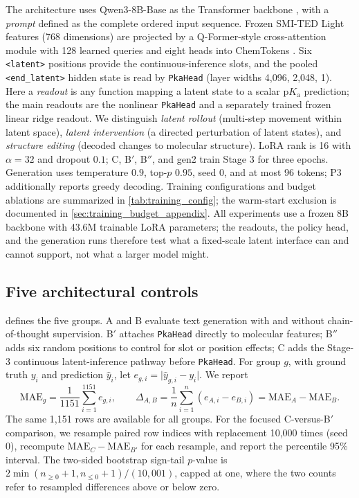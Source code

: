\documentclass[11pt]{article}
\newcommand{\pka}{\mathrm{p}K_{\mathrm a}}
\newcommand{\MAE}{\mathrm{MAE}}
\begin{document}
The architecture uses Qwen3-8B-Base as the Transformer backbone \citep{Vaswani2017Attention,Yang2025Qwen3}, with a \emph{prompt} defined as the complete ordered input sequence. Frozen SMI-TED Light features (768 dimensions) are projected by a Q-Former-style cross-attention module with 128 learned queries and eight heads into ChemTokens \citep{Soares2025SMITED,Li2023BLIP2}. Six \texttt{<latent>} positions provide the continuous-inference slots, and the pooled \texttt{<end\_latent>} hidden state is read by \texttt{PkaHead} (layer widths 4{,}096, 2{,}048, 1). Here a \emph{readout} is any function mapping a latent state to a scalar $\pka$ prediction; the main readouts are the nonlinear \texttt{PkaHead} and a separately trained frozen linear ridge readout. We distinguish \emph{latent rollout} (multi-step movement within latent space), \emph{latent intervention} (a directed perturbation of latent states), and \emph{structure editing} (decoded changes to molecular structure). LoRA rank is 16 with $\alpha=32$ and dropout $0.1$; C, B$'$, B$''$, and gen2 train Stage 3 for three epochs. Generation uses temperature $0.9$, top-$p$ $0.95$, seed 0, and at most 96 tokens; P3 additionally reports greedy decoding. Training configurations and budget ablations are summarized in \cref{tab:training_config}; the warm-start exclusion is documented in \cref{sec:training_budget_appendix}. All experiments use a frozen 8B backbone with 43.6M trainable LoRA parameters; the readouts, the policy head, and the generation runs therefore test what a fixed-scale latent interface can and cannot support, not what a larger model might.



\subsection{Five architectural controls}

 defines the five groups. A and B evaluate text generation with and without chain-of-thought supervision. B$'$ attaches \texttt{PkaHead} directly to molecular features; B$''$ adds six random positions to control for slot or position effects; C adds the Stage-3 continuous latent-inference pathway before \texttt{PkaHead}. For group $g$, with ground truth $y_i$ and prediction $\hat y_i$, let $e_{g,i}=\lvert\hat y_{g,i}-y_i\rvert$. We report
\begin{equation}
  \MAE_g = \frac{1}{1151}\sum_{i=1}^{1151}e_{g,i},
  \qquad
  \Delta_{A,B}=\frac1n\sum_{i=1}^{n}(e_{A,i}-e_{B,i})=\MAE_A-\MAE_B .
\end{equation}
The same 1{,}151 rows are available for all groups. For the focused C-versus-B$'$ comparison, we resample paired row indices with replacement 10{,}000 times (seed 0), recompute $\MAE_C-\MAE_{B'}$ for each resample, and report the percentile 95\% interval. The two-sided bootstrap sign-tail $p$-value is $2\min(n_{\geq0}+1,n_{\leq0}+1)/(10{,}001)$, capped at one, where the two counts refer to resampled differences above or below zero.
\end{document}
